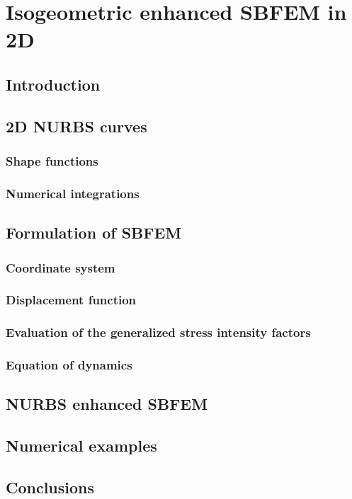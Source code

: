 
\chapter{Isogeometric enhanced SBFEM in 2D}

\section{Introduction}

\section{2D NURBS curves}

    \subsection{Shape functions}

    \subsection{Numerical integrations}

\section{Formulation of SBFEM}

    \subsection{Coordinate system}

    \subsection{Displacement function}

    \subsection{Evaluation of the generalized stress intensity factors}

    \subsection{Equation of dynamics}

\section{NURBS enhanced SBFEM}

\section{Numerical examples}

\section{Conclusions}